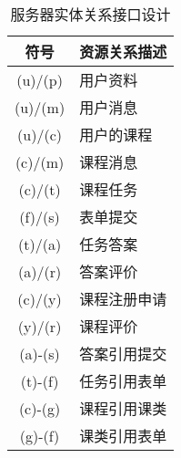 \noindent
\ttfamily
\begin{longtable}{|c|l|}

  \caption{服务器实体关系接口设计\label{APURIRelation}}
  \\
  \hline

  \textbf{符号} & \textbf{资源关系描述} \\ \hline

  (u)/(p) & 用户资料     \\ \hline
  (u)/(m) & 用户消息     \\ \hline
  (u)/(c) & 用户的课程   \\ \hline
  (c)/(m) & 课程消息     \\ \hline
  (c)/(t) & 课程任务     \\ \hline
  (f)/(s) & 表单提交     \\ \hline
  (t)/(a) & 任务答案     \\ \hline
  (a)/(r) & 答案评价     \\ \hline
  (c)/(y) & 课程注册申请 \\ \hline
  (y)/(r) & 课程评价     \\ \hline
  (a)-(s) & 答案引用提交 \\ \hline
  (t)-(f) & 任务引用表单 \\ \hline
  (c)-(g) & 课程引用课类 \\ \hline
  (g)-(f) & 课类引用表单 \\ \hline

\end{longtable}

